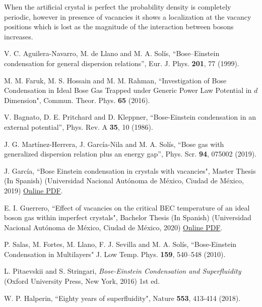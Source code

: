 \documentclass[twocolumn,showpacs,showkeys,preprintnumbers,superscriptaddress, pra, 10pt, aps]{revtex4-2}
\begin{document}

When the artificial crystal is perfect the probability density is completely periodic, however in presence of vacancies it shows a
localization at the vacancy positions which is lost as the magnitude of the interaction between bosons increases.


\begin{thebibliography}{55}
  V. C. Aguilera-Navarro, M. de Llano and M. A. Solís, ``Bose–Einstein condensation for general dispersion relations”, Eur. J. Phys. \textbf{201}, 77 (1999).

  M. M. Faruk, M. S. Hossain and M. M. Rahman, ``Investigation of Bose Condensation in Ideal Bose Gas Trapped under Generic Power Law Potential in $d$ Dimension", Commun. Theor. Phys. \textbf{65} (2016).

  V. Bagnato, D. E. Pritchard and D. Kleppner, ``Bose-Einstein condensation in an external potential”, Phys. Rev. A \textbf{35}, 10 (1986).

  J. G. Martínez-Herrera, J. García-Nila and M. A. Solís, ``Bose gas with generalized dispersion relation plus an energy gap”, Phys. Scr. \textbf{94}, 075002 (2019).

   J. Garc\'ia, ``Bose Einstein condensation in crystals with vacancies", Master Thesis (In Spanish) (Universidad Nacional Autónoma de México, Ciudad de México, 2019)  \href{http://132.248.9.195/ptd2019/enero/0784392/Index.html}{Online PDF}.

   E. I. Guerrero, ``Effect of vacancies on the critical BEC temperature of an ideal boson gas within imperfect crystals", Bachelor Thesis (In Spanish) (Universidad Nacional Autónoma de México, Ciudad de México, 2020) \href{http://132.248.9.195/ptd2020/octubre/0804017/Index.html}{Online PDF}.

  P. Salas, M. Fortes, M. Llano, F. J. Sevilla and M. A. Solís, ``Bose-Einstein Condensation in Multilayers" J. Low Temp. Phys. \textbf{159}, 540–548 (2010).

  L. Pitaevskii and S. Stringari, \textit{Bose-Einstein Condensation and Superfluidity}  (Oxford University Press, New York, 2016) 1st ed.

  W. P. Halperin, ``Eighty years of superfluidity", Nature {\bf 553}, 413-414 (2018).



\end{thebibliography}
\end{document}
